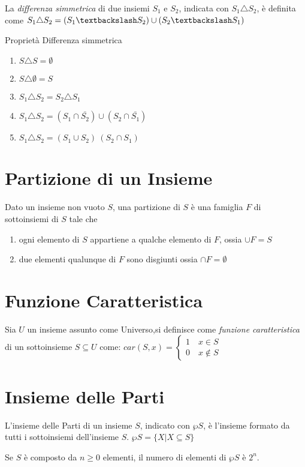 La \textit{differenza simmetrica} di due insiemi $S_1$ e $S_2$, indicata con $S_1 \triangle S_2$,
è definita come $S_1 \triangle S_2 = (S_1 \textbackslash S_2) \cup (S_2 \textbackslash S_1) $

\begin{prop}
Proprietà Differenza simmetrica
\begin{enumerate}
  \item $S \triangle S = \emptyset$
  \item $S \triangle \emptyset = S$
  \item $S_1 \triangle S_2 = S_2 \triangle S_1$
  \item $S_1 \triangle S_2 = (S_1 \cap \bar{S_2}) \cup (S_2 \cap \bar{S_1})$
  \item $S_1 \triangle S_2 = (S_1 \cup S_2) \ (S_2 \cap S_1)$
\end{enumerate}
\end{prop}

\section{Partizione di un Insieme}
Dato un insieme non vuoto $S$, una partizione di $S$ è una famiglia $F$ di sottoinsiemi di $S$ tale che
\begin{enumerate}
    \item ogni elemento di $S$ appartiene a qualche elemento di $F$, ossia $\cup F = S$
    \item due elementi qualunque di $F$ sono disgiunti ossia $\cap F = \emptyset$
\end{enumerate}

\section{Funzione Caratteristica}
Sia $U$ un insieme assunto come Universo,si definisce come \emph{funzione caratteristica}
di un sottoinsieme $S \subseteq U$ come:
$car(S,x) = \begin{cases} 1 \quad x \in S \\ 0 \quad x \not \in S \end{cases}$

\section{Insieme delle Parti}
L'insieme delle Parti di un insieme $S$, indicato con $\wp S$, è l'insieme formato
da tutti i sottoinsiemi dell'insieme $S$. \newline
$\wp S = \{X | X \subseteq S\} $

\begin{defi}
Se $S$ è composto da $n \geq 0$ elementi, il numero di elementi di $\wp S$ è $2 ^ n$.
\end{defi}


